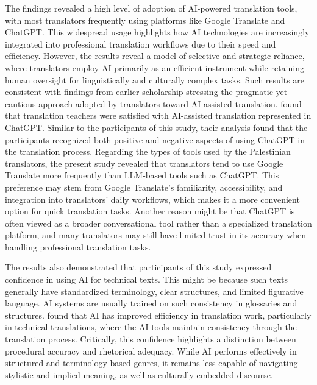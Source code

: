 \documentclass[english]{textolivre}
\begin{document}
The findings revealed a high level of adoption of AI-powered translation tools, with most translators frequently using platforms like Google Translate and ChatGPT. This widespread usage highlights how AI technologies are increasingly integrated into professional translation workflows due to their speed and efficiency. However, the results reveal a model of selective and strategic reliance, where translators employ AI primarily as an efficient instrument while retaining human oversight for linguistically and culturally complex tasks. Such results are consistent with findings from earlier scholarship stressing the pragmatic yet cautious approach adopted by translators toward AI-assisted translation. \textcite{SahariAlKadiAli2023ChatGPTTranslation} found that translation teachers were satisfied with AI-assisted translation represented in ChatGPT. Similar to the participants of this study, their analysis found that the participants recognized both positive and negative aspects of using ChatGPT in the translation process. Regarding the types of tools used by the Palestinian translators, the present study revealed that translators tend to use Google Translate more frequently than LLM-based tools such as ChatGPT. This preference may stem from Google Translate’s familiarity, accessibility, and integration into translators’ daily workflows, which makes it a more convenient option for quick translation tasks. Another reason might be that ChatGPT is often viewed as a broader conversational tool rather than a specialized translation platform, and many translators may still have limited trust in its accuracy when handling professional translation tasks.

The results also demonstrated that participants of this study expressed confidence in using AI for technical texts. This might be because such texts generally have standardized terminology, clear structures, and limited figurative language. AI systems are usually trained on such consistency in glossaries and structures. \textcite{AlyamiAlzubi2025HumanTranslatorsAI} found that AI has improved efficiency in translation work, particularly in technical translations, where the AI tools maintain consistency through the translation process. Critically, this confidence highlights a distinction between procedural accuracy and rhetorical adequacy. While AI performs effectively in structured and terminology-based genres, it remains less capable of navigating stylistic and implied meaning, as well as culturally embedded discourse.
\end{document}
